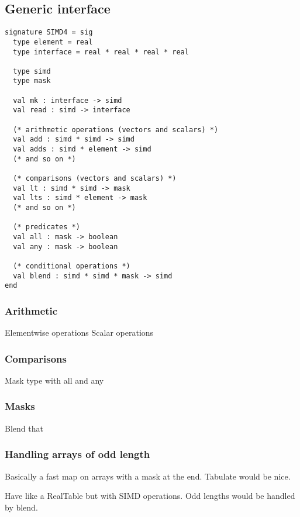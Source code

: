 \documentclass{article}
\begin{document}
\subsection{Generic interface}

\begin{lstlisting}[frame=single]
signature SIMD4 = sig
  type element = real
  type interface = real * real * real * real

  type simd
  type mask

  val mk : interface -> simd
  val read : simd -> interface

  (* arithmetic operations (vectors and scalars) *)
  val add : simd * simd -> simd
  val adds : simd * element -> simd
  (* and so on *)

  (* comparisons (vectors and scalars) *)
  val lt : simd * simd -> mask
  val lts : simd * element -> mask
  (* and so on *)

  (* predicates *)
  val all : mask -> boolean
  val any : mask -> boolean

  (* conditional operations *)
  val blend : simd * simd * mask -> simd
end
\end{lstlisting}


\subsubsection{Arithmetic}

Elementwise operations
Scalar operations

\subsubsection{Comparisons}

Mask type with all and any

\subsubsection{Masks}

Blend that 

\subsubsection{Handling arrays of odd length}


Basically a fast map on arrays with a mask at the end.
Tabulate would be nice.

Have like a RealTable but with SIMD operations. Odd lengths would be handled by blend.
\end{document}
